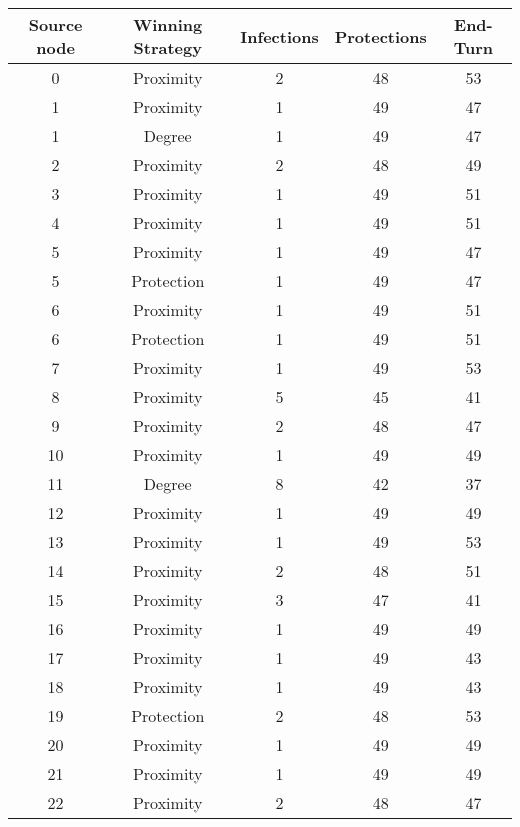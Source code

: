 \documentclass[results.tex]{subfiles}
\begin{document}
\begin{center}
  \begin{tabular}{| c || c | c | c | c |}
    \hline
    {\bfseries Source node} & {\bfseries Winning Strategy} & {\bfseries Infections} & {\bfseries Protections} & {\bfseries End-Turn} \\  %
    \hline\hline
    0 & Proximity & 2 & 48 & 53 \\ 
    \hline
    1 & Proximity & 1 & 49 & 47 \\ 
    \hline
    1 & Degree & 1 & 49 & 47 \\ 
    \hline
    2 & Proximity & 2 & 48 & 49 \\ 
    \hline
    3 & Proximity & 1 & 49 & 51 \\ 
    \hline
    4 & Proximity & 1 & 49 & 51 \\ 
    \hline
    5 & Proximity & 1 & 49 & 47 \\ 
    \hline
    5 & Protection & 1 & 49 & 47 \\ 
    \hline
    6 & Proximity & 1 & 49 & 51 \\ 
    \hline
    6 & Protection & 1 & 49 & 51 \\ 
    \hline
    7 & Proximity & 1 & 49 & 53 \\ 
    \hline
    8 & Proximity & 5 & 45 & 41 \\ 
    \hline
    9 & Proximity & 2 & 48 & 47 \\ 
    \hline
    10 & Proximity & 1 & 49 & 49 \\ 
    \hline
    11 & Degree & 8 & 42 & 37 \\ 
    \hline
    12 & Proximity & 1 & 49 & 49 \\ 
    \hline
    13 & Proximity & 1 & 49 & 53 \\ 
    \hline
    14 & Proximity & 2 & 48 & 51 \\ 
    \hline
    15 & Proximity & 3 & 47 & 41 \\ 
    \hline
    16 & Proximity & 1 & 49 & 49 \\ 
    \hline
    17 & Proximity & 1 & 49 & 43 \\ 
    \hline
    18 & Proximity & 1 & 49 & 43 \\ 
    \hline
    19 & Protection & 2 & 48 & 53 \\ 
    \hline
    20 & Proximity & 1 & 49 & 49 \\ 
    \hline
    21 & Proximity & 1 & 49 & 49 \\ 
    \hline
    22 & Proximity & 2 & 48 & 47 \\ 

\end{tabular}
\end{center}
\end{document}

